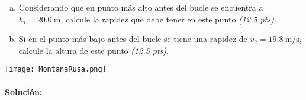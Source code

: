 \documentclass[
  12pt,
]{article}
\newcommand{\pts}[1]{ {\it (#1 pts)}}
\newcommand{\unit}[1]{\:\mathrm{#1}}
\begin{document}
\begin{enumerate}[a)]
  \item Considerando que en punto más alto antes del bucle se encuentra a
    $h_i=20.0\unit{m}$, calcule la rapidez que debe tener en este punto \pts{12.5}.
  \item Si en el punto más bajo antes del bucle se tiene una rapidez de
    $v_2 = 19.8\unit{m /s}$, calcule la altura de este punto \pts{12.5}.
\end{enumerate}

\begin{center}
  \texttt{[image: MontanaRusa.png]}
\end{center}

\paragraph{Solución:}
\end{document}
